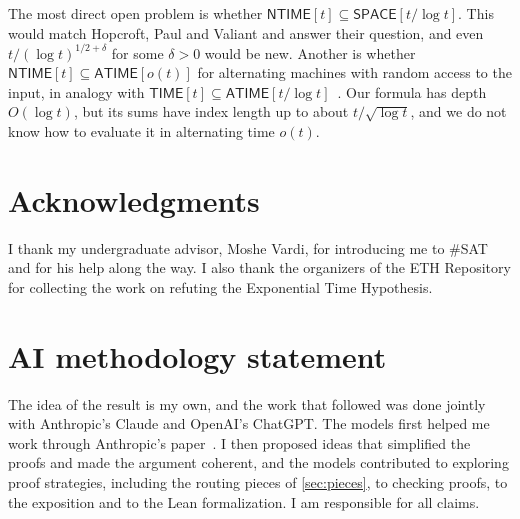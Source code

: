 \documentclass[11pt]{article}
\theoremstyle{definition}
\theoremstyle{definition}
\theoremstyle{remark}
\newcommand{\NTIME}{\mathsf{NTIME}}
\newcommand{\TIME}{\mathsf{TIME}}
\newcommand{\SPACE}{\mathsf{SPACE}}
\newcommand{\ATIME}{\mathsf{ATIME}}
\begin{document}
The most direct open problem is whether $\NTIME[t]\subseteq\SPACE[t/\log t]$. This would match Hopcroft, Paul and Valiant and answer their question, and even $t/(\log t)^{1/2+\delta}$ for some $\delta>0$ would be new. Another is whether $\NTIME[t]\subseteq\ATIME[o(t)]$ for alternating machines with random access to the input, in analogy with $\TIME[t]\subseteq\ATIME[t/\log t]$~\cite{DT85}. Our formula has depth $O(\log t)$, but its sums have index length up to about $t/\sqrt{\log t}$, and we do not know how to evaluate it in alternating time $o(t)$.

\section*{Acknowledgments}
I thank my undergraduate advisor, Moshe Vardi, for introducing me to \#SAT and for his help along the way. I also thank the organizers of the ETH Repository for collecting the work on refuting the Exponential Time Hypothesis.

\section*{AI methodology statement}\label{sec:ai}
The idea of the result is my own, and the work that followed was done jointly with Anthropic's Claude and OpenAI's ChatGPT. The models first helped me work through Anthropic's paper~\cite{Ant26}. I then proposed ideas that simplified the proofs and made the argument coherent, and the models contributed to exploring proof strategies, including the routing pieces of \cref{sec:pieces}, to checking proofs, to the exposition and to the Lean formalization. I am responsible for all claims.
\end{document}
